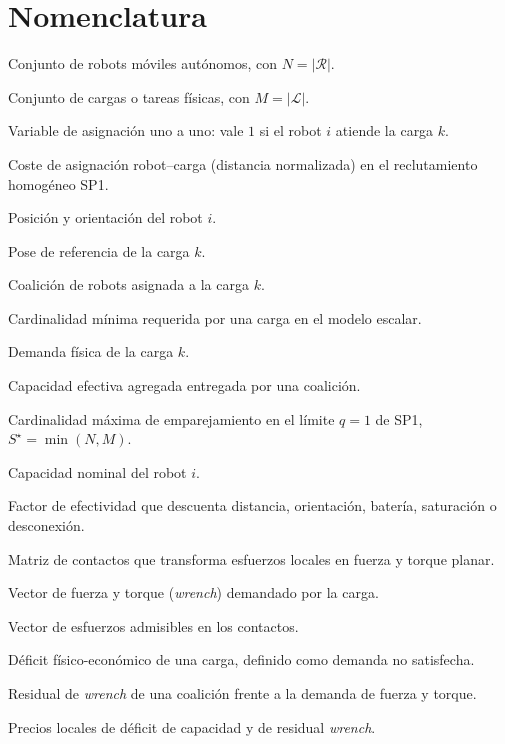\clearpage
{}
{}
\section*{Nomenclatura}

\begin{description}[leftmargin=3.2em,style=nextline]
  \item[$\mathcal R$] Conjunto de robots móviles autónomos, con $N=|\mathcal R|$.
  \item[$\mathcal L$] Conjunto de cargas o tareas físicas, con $M=|\mathcal L|$.
  \item[$a_{ik}$] Variable de asignación uno a uno: vale $1$ si el robot $i$ atiende la carga $k$.
  \item[$c_{ik}$] Coste de asignación robot--carga (distancia normalizada) en el reclutamiento homogéneo SP1.
  \item[$q_i,\theta_i$] Posición y orientación del robot $i$.
  \item[$q_k^L$] Pose de referencia de la carga $k$.
  \item[$C_k$] Coalición de robots asignada a la carga $k$.
  \item[$n_k$] Cardinalidad mínima requerida por una carga en el modelo escalar.
  \item[$D_k$] Demanda física de la carga $k$.
  \item[$S_k$] Capacidad efectiva agregada entregada por una coalición.
  \item[$S^\star$] Cardinalidad máxima de emparejamiento en el límite $q=1$ de SP1, $S^\star=\min(N,M)$.
  \item[$c_i$] Capacidad nominal del robot $i$.
  \item[$\eta_{ik}$] Factor de efectividad que descuenta distancia, orientación, batería, saturación o desconexión.
  \item[$G_C$] Matriz de contactos que transforma esfuerzos locales en fuerza y torque planar.
  \item[$w_k^{\rm dem}$] Vector de fuerza y torque (\emph{wrench}) demandado por la carga.
  \item[$\lambda$] Vector de esfuerzos admisibles en los contactos.
  \item[$\delta_k$] Déficit físico-económico de una carga, definido como demanda no satisfecha.
  \item[$\rho_k$] Residual de \emph{wrench} de una coalición frente a la demanda de fuerza y torque.
  \item[$\pi_k,\mu_k$] Precios locales de déficit de capacidad y de residual \emph{wrench}.

\end{description}
